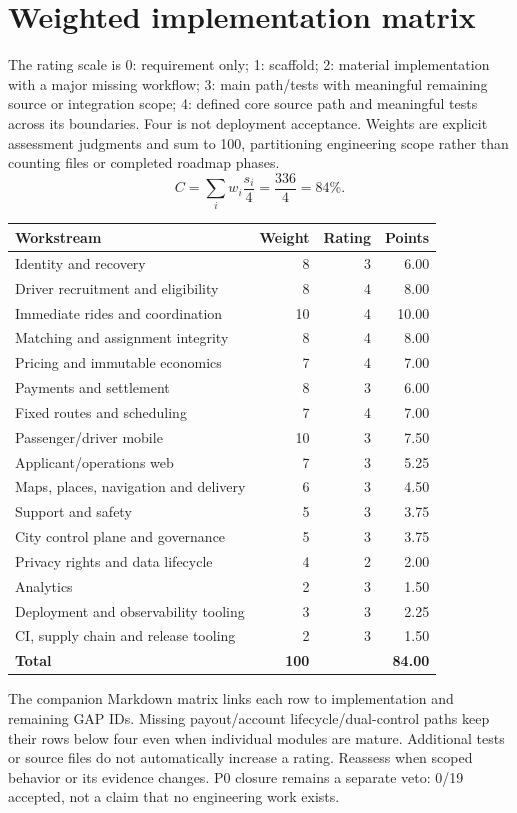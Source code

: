 \documentclass[11pt,a4paper]{article}
\begin{document}
\section{Weighted implementation matrix}\label{sec:score}
The rating scale is 0: requirement only; 1: scaffold; 2: material implementation
with a major missing workflow; 3: main path/tests with meaningful remaining
source or integration scope; 4: defined core source path and meaningful tests
across its boundaries. Four is not deployment acceptance. Weights are explicit
assessment judgments and sum to 100, partitioning engineering scope rather than
counting files or completed roadmap phases.
\[
 C=\sum_i w_i\frac{s_i}{4}=\frac{336}{4}=84\%.
\]
\begin{table}[H]\centering
\begin{tabular}{@{}p{}rrr@{}}
\toprule Workstream & Weight & Rating & Points \\\midrule
Identity and recovery & 8 & 3 & 6.00 \\
Driver recruitment and eligibility & 8 & 4 & 8.00 \\
Immediate rides and coordination & 10 & 4 & 10.00 \\
Matching and assignment integrity & 8 & 4 & 8.00 \\
Pricing and immutable economics & 7 & 4 & 7.00 \\
Payments and settlement & 8 & 3 & 6.00 \\
Fixed routes and scheduling & 7 & 4 & 7.00 \\
Passenger/driver mobile & 10 & 3 & 7.50 \\
Applicant/operations web & 7 & 3 & 5.25 \\
Maps, places, navigation and delivery & 6 & 3 & 4.50 \\
Support and safety & 5 & 3 & 3.75 \\
City control plane and governance & 5 & 3 & 3.75 \\
Privacy rights and data lifecycle & 4 & 2 & 2.00 \\
Analytics & 2 & 3 & 1.50 \\
Deployment and observability tooling & 3 & 3 & 2.25 \\
CI, supply chain and release tooling & 2 & 3 & 1.50 \\\midrule
\textbf{Total} & \textbf{100} & & \textbf{84.00} \\\bottomrule
\end{tabular}
\end{table}
The companion Markdown matrix links each row to implementation and remaining
GAP IDs. Missing payout/account lifecycle/dual-control paths keep their rows
below four even when individual modules are mature. Additional tests or source
files do not automatically increase a rating. Reassess when scoped behavior or
its evidence changes. P0 closure remains a separate veto: 0/19 accepted, not a
claim that no engineering work exists.
\end{document}
